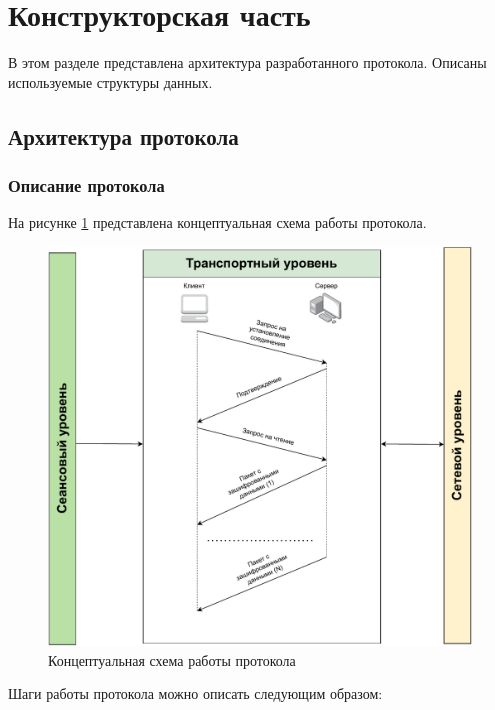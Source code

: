 \section{Конструкторская часть}

В этом разделе представлена архитектура разработанного протокола. Описаны используемые структуры данных.

\subsection{Архитектура протокола}

\subsubsection{Описание протокола}

На рисунке \ref{fig:proto_scheme} представлена концептуальная схема работы протокола.

\begin{figure}[H]
	\centering
	\includegraphics[scale=0.75]{img/proto_scheme.pdf}
	\caption{Концептуальная схема работы протокола}
	\label{fig:proto_scheme}
\end{figure}

Шаги работы протокола можно описать следующим образом:

